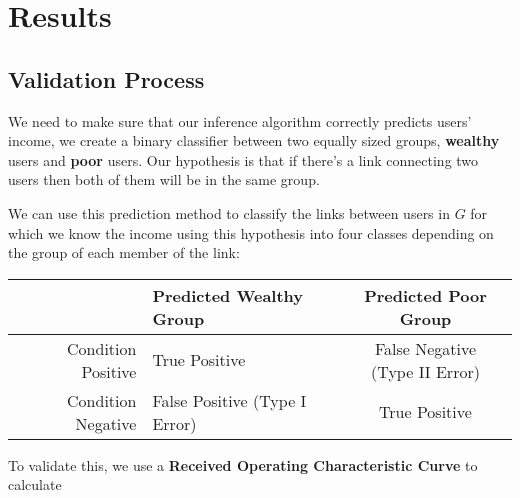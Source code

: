 \section{Results}

\subsection{Validation Process}

We need to make sure that our inference algorithm correctly predicts users' income, we create a binary classifier between two equally sized groups, \textbf{wealthy} users and \textbf{poor} users. Our hypothesis is that if there's a link connecting two users then both of them will be in the same group.

We can use this prediction method to classify the links between users in $ G $ for which we know the income using this hypothesis into four classes depending on the group of each member of the link:

\begin{tabularx}{\textwidth}{|r|X|c|} \hline
& Predicted Wealthy Group & Predicted Poor Group \\ \hline
Condition Positive & True Positive & \makecell{False Negative \\ (Type II Error)} \\ \hline
Condition Negative & False Positive (Type I Error) & True Positive \\ \hline
\end{tabularx}

To validate this, we use a \textbf{Received Operating Characteristic Curve} to calculate 
